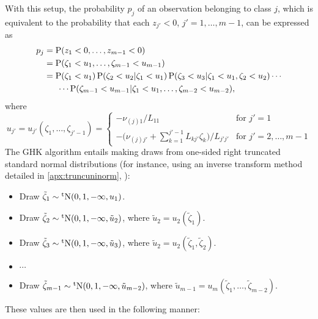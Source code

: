 With this setup, the probability $p_{j}$ of an observation belonging to class $j$, which is equivalent to the probability that each $ z_{j'} < 0$, $j'=1,\dots,m-1$, can be expressed as
\begin{align*}
  p_j 
  &= \operatorname{P}( z_1 < 0,\dots, z_{m-1} < 0) \\
  &= 
  \operatorname{P}(\zeta_1 < u_1,\dots,\zeta_{m-1}<u_{m-1}) \\
  &= 
  \operatorname{P}(\zeta_1 < u_1)
  \operatorname{P}(\zeta_2 < u_2|\zeta_1 < u_1)
  \operatorname{P}(\zeta_3 < u_3|\zeta_1 < u_1,\zeta_2 < u_2)
  \cdots \\
  &\phantom{==}\cdots
  \operatorname{P}(\zeta_{m-1}<u_{m-1}|\zeta_1 < u_1,\dots,\zeta_{m-2}<u_{m-2}),
\end{align*}
where 
\begin{equation*}
  u_{j'} = 
  u_{j'}(\zeta_1,\dots,\zeta_{j'-1}) =
  \begin{cases}
    - \nu_{(j)1} / L_{11} &\text{for } j' = 1 \\
    - \big(\nu_{(j)j'} + \sum_{k=1}^{j'-1} L_{kj'}\zeta_k \big) / L_{j'j'} &\text{for } j' = 2,\dots,m-1
  \end{cases}
\end{equation*}
The GHK algorithm entails making draws from one-sided right truncated standard normal distributions (for instance, using an inverse transform method detailed in \cref{apx:truncuninorm},  ):
\begin{itemize}
  \item Draw $\tilde\zeta_1 \sim \operatorname{{}^tN}(0,1,-\infty,u_1)$.
  \item Draw $\tilde\zeta_2 \sim \operatorname{{}^tN}(0,1,-\infty,\tilde u_2)$, where $\tilde u_2 = u_2(\tilde\zeta_1)$.
  \item Draw $\tilde\zeta_3 \sim \operatorname{{}^tN}(0,1,-\infty,\tilde u_3)$, where $\tilde u_2 = u_2(\tilde\zeta_1,\tilde\zeta_2)$. 
  \item $\cdots$
  \item Draw $\tilde\zeta_{m-1} \sim \operatorname{{}^tN}(0,1,-\infty,\tilde u_{m-2})$, where $\tilde u_{m-1} = u_m(\tilde\zeta_1,\dots,\tilde\zeta_{m-2})$.
\end{itemize}
These values are then used in the following manner:
